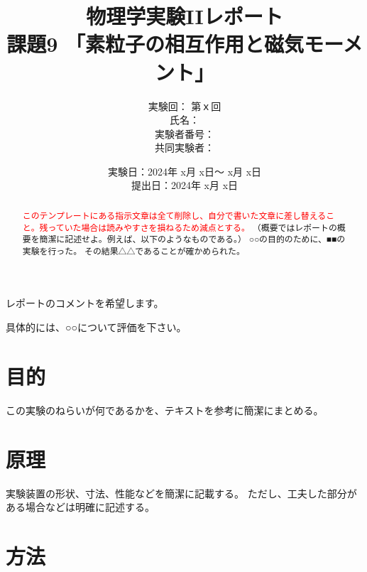 \documentclass[uplatex,dvipdfmx,a4j,12pt]{jsarticle}
\title{
  物理学実験IIレポート\\    %
  課題9 「素粒子の相互作用と磁気モーメント」
  }
\author{
  実験回： 第ｘ回 \\
  氏名： \\
  実験者番号：
  \\
  共同実験者：
  }
\date{
  実験日：2024年 x月 x日～ x月 x日 \\
  提出日：2024年 x月 x日}  %
\begin{document}
\maketitle


\vspace{2em}
\begin{center}
    \begin{minipage}{0.5\linewidth}
        レポートのコメントを希望します。

        具体的には、○○について評価を下さい。
    \end{minipage}
\end{center}

\vspace{5em}  


%
\begin{abstract}
    \textcolor{red}{このテンプレートにある指示文章は全て削除し、自分で書いた文章に差し替えること。残っていた場合は読みやすさを損ねるため減点とする。}
    （概要ではレポートの概要を簡潔に記述せよ。例えば、以下のようなものである。）
    ○○の目的のために、■■の実験を行った。
    その結果△△であることが確かめられた。
\end{abstract}

\newpage


\section{目的}
この実験のねらいが何であるかを、テキストを参考に簡潔にまとめる。


\section{原理}
実験装置の形状、寸法、性能などを簡潔に記載する。
ただし、工夫した部分がある場合などは明確に記述する。


\section{方法}
\end{document}
